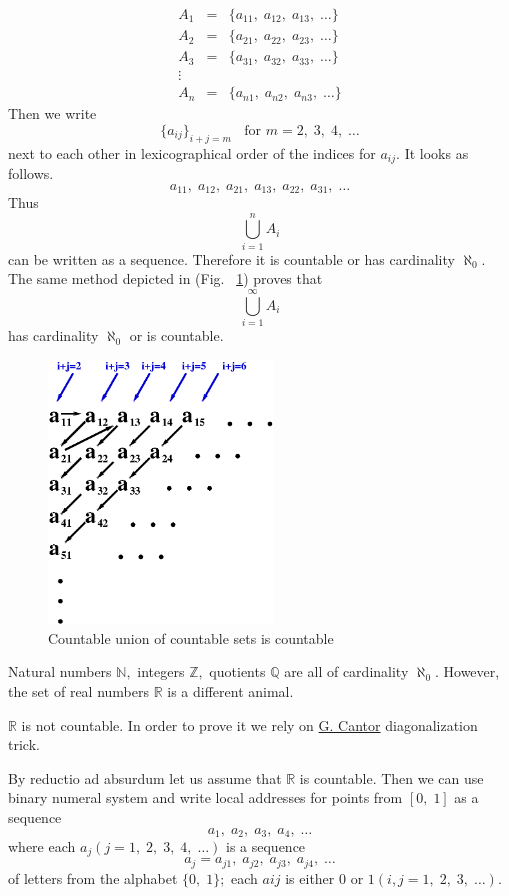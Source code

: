 \documentclass[color=black,11pt]{elegantpaper}
\begin{document}
\begin{eqnarray*}
A_1 &=& \{a_{11},\;a_{12},\;a_{13},\; \dots \}\\
A_2 &=& \{a_{21},\;a_{22},\;a_{23},\; \dots \}\\
A_3 &=& \{a_{31},\;a_{32},\;a_{33},\; \dots \}\\
\vdots \\
A_n &=& \{a_{n1},\;a_{n2},\;a_{n3},\; \dots \}
\end{eqnarray*} 
Then we write
$$
\{ a_{ij}\}_{i+j=m} \;\;\mbox{ for } m=2,\;3,\;4,\;\dots
$$
next to each other in lexicographical order of the indices for $a_{ij}.$ It looks as follows.
$$
a_{11},\; a_{12},\;a_{21},\;a_{13},\;a_{22},\;a_{31},\;\dots
$$
Thus
$$
\bigcup_{i = 1}^n A_i 
$$
can be written as a sequence. Therefore it is countable or has cardinality $\aleph_0.$ The same method depicted in (Fig. ~\ref{fig:countable}) proves that
$$
\bigcup_{i = 1}^\infty A_i
$$
has cardinality $\aleph_0$ or is countable.
\begin{figure}[htbp]
  \centering
  \includegraphics[width=6cm, height=7cm]{xfig_stuff/Countable.eps}
  \caption{Countable union of countable sets is countable}
  \label{fig:countable}
\end{figure}

Natural numbers $\mathbb{N},$ integers $\mathbb{Z},$ quotients $\mathbb{Q}$ are all of cardinality $\aleph_0 .$ However, the set of real numbers $\mathbb{R}$ is a different animal. 

$\mathbb{R}$ is not countable. In order to prove it we rely on \href{https://en.wikipedia.org/wiki/Georg_Cantor}{G. Cantor} diagonalization trick.

By reductio ad absurdum let us assume that $\mathbb{R}$ is countable. Then we can use binary numeral system and write local addresses for points from $[0,\;1]$ as a sequence
$$
a_1,\;a_2,\;a_3,\;a_4,\; \dots
$$
where each $a_j (j=1,\; 2,\; 3,\;4,\; \dots)$ is a sequence
$$
a_j = a_{j1},\;a_{j2},\;a_{j3},\;a_{j4}, \; \dots
$$
 of letters from the alphabet $\{0,\;1\};$ each $a{ij}$ is either $0$ or $1 (i,j=1,\;2,\;3,\;\dots ).$ 
\end{document}
